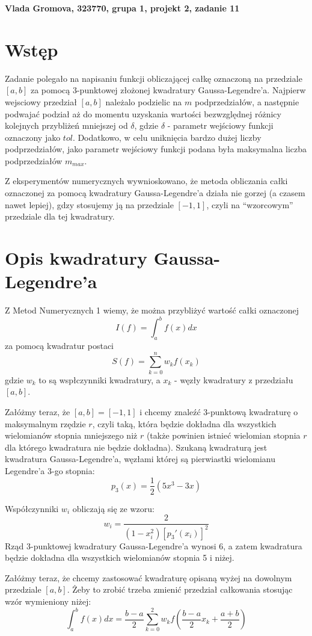 \documentclass[a4paper,12pt]{article}
\begin{document}
\def\tablename{Tabela} 
\noindent
\textbf{Vlada Gromova, 323770, grupa 1, projekt 2, zadanie 11}


\section*{Wstęp}
Zadanie polegało na napisaniu funkcji obliczającej całkę oznaczoną na przedziale $[a,b]$ za pomocą 3-punktowej złożonej kwadratury Gaussa-Legendre'a. Najpierw wejsciowy przedział $[a,b]$ należalo podzielic na $m$ podprzedziałów, a następnie podwajać podział aż do momentu uzyskania wartości bezwzględnej różnicy kolejnych przybliżeń mniejszej od $\delta$, gdzie $\delta$ - parametr wejściowy funkcji oznaczony jako $tol$. Dodatkowo, w celu uniknięcia bardzo dużej liczby podprzedziałów, jako parametr wejściowy funkcji podana była maksymalna liczba podprzedziałów $m_{max}$.

Z eksperymentów numerycznych wywnioskowano, że metoda obliczania całki oznaczonej za pomocą kwadratury Gaussa-Legendre'a działa nie gorzej (a czasem nawet lepiej), gdzy stosujemy ją na przedziale $[-1,1]$, czyli na ``wzorcowym'' przedziale dla tej kwadratury.

\section*{Opis kwadratury Gaussa-Legendre'a}
Z Metod Numerycznych 1 wiemy, że można przybliżyć wartość całki oznaczonej
$$
I(f) = \int_{a}^b f(x)dx
$$
za pomocą kwadratur postaci
$$
S(f) = \sum_{k=0}^{n} w_k f(x_k)
$$
gdzie $w_k$ to są wspłczynniki kwadratury, a $x_k$ - węzły kwadratury z przedziału $[a,b]$.

Załóżmy teraz, że $[a,b] = [-1,1]$ i chcemy znaleźć 3-punktową kwadraturę o maksymalnym rzędzie $r$, czyli taką, która będzie dokładna dla wszystkich wielomianów stopnia mniejszego niż $r$ (także powinien istnieć wielomian stopnia $r$ dla którego kwadratura nie będzie dokładna). Szukaną kwadraturą jest kwadratura Gaussa-Legendre'a, węzłami której są pierwiastki wielomianu Legendre'a 3-go stopnia:
$$
p_3(x) = \frac{1}{2}(5x^3 - 3x)
$$

Współczynniki $w_i$ obliczają się ze wzoru:
$$
w_i = \frac{2}{(1-x_i^2)[p_3'(x_i)]^2}
$$
Rząd 3-punktowej kwadratury Gaussa-Legendre'a wynosi 6, a zatem kwadratura będzie dokładna dla wszystkich wielomianów stopnia 5 i niżej. 

Załóżmy teraz, że chcemy zastosować kwadraturę opisaną wyżej na dowolnym przedziale $[a,b]$. Żeby to zrobić trzeba zmienić przedział całkowania stosując wzór wymieniony niżej:
$$
\int_{a}^b f(x)dx = \frac{b-a}{2}\sum_{k=0}^{2} w_k f(\frac{b-a}{2}x_k + \frac{a+b}{2})
$$
\end{document}
